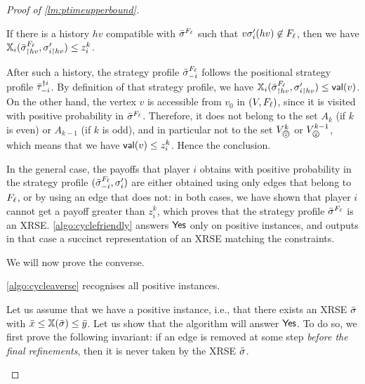 \begin{proof}[Proof of \cref{lm:ptimeupperbound}]
\begin{claimproof}
\begin{claim}
    If there is a history $hv$ compatible with ${\bar{\sigma}}^{F_\ell}$ such that $v\sigma'_i(hv) \not\in F_\ell$, then we have $\mathbb{X}_i({\bar{\sigma}}^{F_\ell}_{\upharpoonright hv}, \sigma'_{i\upharpoonright hv}) \leq z_i^k$.
\end{claim}

\begin{claimproof}
    After such a history, the strategy profile ${\bar{\sigma}}^{F_\ell}_{-i}$ follows the positional strategy profile ${\bar{\tau}}^{\dag i}_{-i}$.
    By definition of that strategy profile, we have $\mathbb{X}_i({\bar{\sigma}}^{F_\ell}_{\upharpoonright hv}, \sigma'_{i\upharpoonright hv}) \leq \mathsf{val}(v)$.
    On the other hand, the vertex $v$ is accessible from $v_0$ in $(V, F_\ell)$, since it is visited with positive probability in ${\bar{\sigma}}^{F_\ell}$.
    Therefore, it does not belong to the set $A_k$ (if $k$ is even) or $A_{k-1}$ (if $k$ is odd), and in particular not to the set $V_\bad^k$ or $V_\bad^{k-1}$, which means that we have $\mathsf{val}(v) \leq z_i^k$.
    Hence the conclusion.
\end{claimproof}



In the general case, the payoffs that player $i$ obtains with positive probability in the strategy profile $({\bar{\sigma}}^{F_\ell}_{-i}, \sigma'_i)$ are either obtained using only edges that belong to $F_\ell$, or by using an edge that does not: in both cases, we have shown that player $i$ cannot get a payoff greater than $z_i^k$, which proves that the strategy profile ${\bar{\sigma}}^{F_\ell}$ is an XRSE.
\cref{algo:cyclefriendly} answers $\mathsf{Yes}$ only on positive instances, and outputs in that case a succinct representation of an XRSE matching the constraints.
\end{claimproof}


We will now prove the converse.

            \begin{proposition}
                \cref{algo:cycleaverse} recognises all positive instances. 
            \end{proposition}
    
            \begin{claimproof}
           Let us assume that we have a positive instance, i.e., that there exists an XRSE ${\bar{\sigma}}$ with ${\bar{x}} \leq \mathbb{X}({\bar{\sigma}}) \leq {\bar{y}}$.
        Let us show that the algorithm will answer $\mathsf{Yes}$.
        To do so, we first prove the following invariant: if an edge is removed at some step \emph{before the final refinements}, then it is never taken by the XRSE ${\bar{\sigma}}$.


\end{claimproof}
\end{proof}
